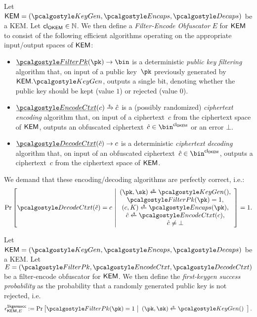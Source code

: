\begin{definition}
\label{def:filter-encode-obfs}
    Let $\KEM = (\kgen, \encaps, \decaps)$ be a KEM.
    Let ${\mathsf{cl}_{\mathsf{OKEM}}} \in \mathbb N$.
    We then define a \emph{Filter-Encode Obfuscator} $E$ for $\mathsf{KEM}$ to consist of the following efficient algorithms operating on the appropriate input/output spaces of $\mathsf{KEM}$:
    \begin{itemize}
        \item $\ul{\filterpk}(\pk) \to \bin$
        is a deterministic \emph{public key filtering} algorithm that, on input of a public key~$\pk$ previously generated by $\KEM.\kgen$, outputs a single bit, denoting whether the public key should be kept (value $1$) or rejected (value $0$).
        \item $\ul{\encodectxt}(c) \tor \hat c$
        is a (possibly randomized) \emph{ciphertext encoding} algorithm that, on input of a ciphertext~$c$ from the ciphertext space of $\mathsf{KEM}$, outputs an obfuscated ciphertext~$\hat c \in \bin^{\obfctxtlen}$ or an error $\bot$.
        \item $\ul{\decodectxt}(\hat c) \to c$
        is a deterministic \emph{ciphertext decoding} algorithm that, on input of an obfuscated ciphertext~$\hat c \in \bin^{\obfctxtlen}$, outputs a ciphertext~$c$ from the ciphertext space of $\mathsf{KEM}$.
    \end{itemize}

    We demand that these encoding/decoding algorithms are perfectly correct, i.e.:
    \[
        \Pr\left[
            \decodectxt(\hat c) = c
        ~\middle|
            \begin{array}{c}
                (\pk, \sk) \getsr \kgen(),\\
                \filterpk(\pk) = 1, \\
                (c, K) \getsr \encaps(\pk),\\
                \hat c \getsr \encodectxt(c),\\
                \hat c \neq \bot
            \end{array}
        \right] = 1.
    \]
\end{definition}

\begin{definition}
\label{def:first-keygen-success}
    Let $\KEM = (\kgen, \encaps, \decaps)$ be a KEM.
    Let $E = (\filterpk, \encodectxt, \decodectxt)$ be a filter-encode obfuscator for $\mathsf{KEM}$.
    We then define the \emph{first-keygen success probability} as the probability that a randomly generated public key is not rejected, i.e.
    \[
        \epsilon^\firstkeygensuccess_{\KEM,E} :=
        \Pr\left[
            \filterpk(\pk) = 1
        ~\middle|
            \begin{array}{c}
                (\pk, \sk) \getsr \kgen()
            \end{array}
        \right].
    \]
\end{definition}

